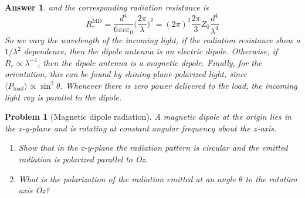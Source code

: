 \documentclass[a4paper]{article}
\newtheorem{ans}{Answer}
\theoremstyle{new}
\newtheorem{qns}{Problem}
\begin{document}
\begin{ans}
and the corresponding radiation resistance is
$$R_r^{\text{MD}}=\frac{d^4}{6\pi c\varepsilon_0}\bigg(\frac{2\pi}{\lambda}\bigg)^2=(2\pi)^2\frac{2\pi}{3}Z_0\frac{d^4}{\lambda^4}$$
So we vary the wavelength of the incoming light, if the radiation resistance show a $1/\lambda^2$ dependence, then the dipole antenna is an electric dipole. Otherwise, if $R_r\propto\lambda^{-4}$, then the dipole antenna is a magnetic dipole. Finally, for the orientation, this can be found by shining plane-polarized light, since $\langle P_{\text{load}}\rangle\propto\sin^2\theta$. Whenever there is zero power delivered to the load, the incoming light ray is parallel to the dipole.
\end{ans}
\newpage
\begin{qns}[Magnetic dipole radiation]
A magnetic dipole at the origin lies in the x-y-plane and is rotating at constant angular frequency about the $z$-axis.
\begin{enumerate}[label=(\alph*)]
\item Show that in the x-y-plane the radiation pattern is circular and the emitted radiation is polarized parallel to Oz.
\item What is the polarization of the radiation emitted at an angle $\theta$ to the rotation axis Oz?
\end{enumerate}
\end{qns}
\end{document}
